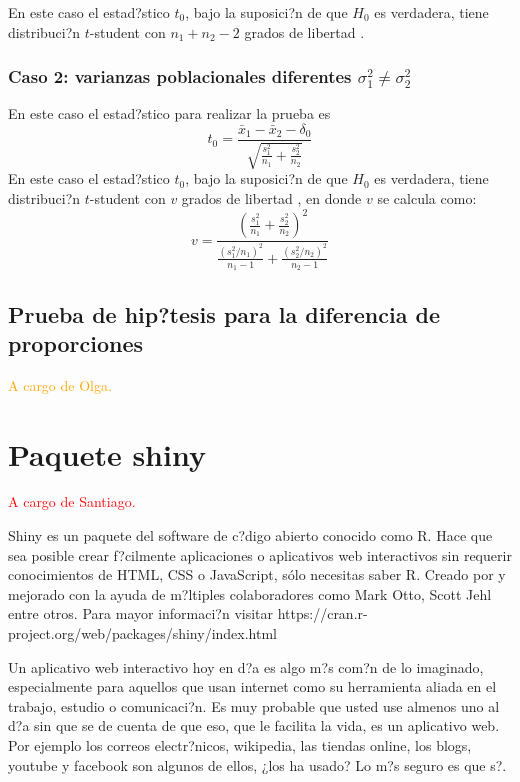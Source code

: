 \documentclass[]{comunicaciones}
\newcommand{\pkg}[1]{{\normalfont\fontseries{b}\selectfont #1}}
\begin{document}
En este caso el estad?stico $t_0$, bajo la suposici?n de que $H_0$ es verdadera, tiene distribuci?n $t$-student con $n_1+n_2-2$ grados de libertad \cite{Walpole12}.

\subsubsection{Caso 2: varianzas poblacionales diferentes $\sigma_1^2 \neq \sigma_2^2$}
En este caso el estad?stico para realizar la prueba es 
$$t_0=\frac{\bar{x}_1 - \bar{x}_2 - \delta_0}{\sqrt{\frac{s_1^2}{n_1} + \frac{s_2^2}{n_2}}}$$
En este caso el estad?stico $t_0$, bajo la suposici?n de que $H_0$ es verdadera, tiene distribuci?n $t$-student con $v$ grados de libertad \cite{Walpole12}, en donde $v$ se calcula como:
$$v=\frac{ \left( \frac{s_1^2}{n_1} + \frac{s_2^2}{n_2} \right)^2 }{ \frac{(s_1^2/n_1)^2}{n_1-1} + \frac{(s_2^2/n_2)^2}{n_2-1}}$$

\subsection{Prueba de hip?tesis para la diferencia de proporciones}
\textcolor{orange}{A cargo de Olga.}

\section{Paquete \pkg{shiny}}
\textcolor{red}{A cargo de Santiago.}

Shiny es un paquete del software de c?digo abierto conocido como R. Hace que sea posible crear f?cilmente aplicaciones o aplicativos web interactivos sin requerir conocimientos de HTML, CSS o JavaScript, sólo necesitas saber R. Creado por \cite{Winston17} y mejorado con la ayuda de m?ltiples colaboradores como Mark Otto, Scott Jehl entre otros. Para mayor informaci?n visitar https://cran.r-project.org/web/packages/shiny/index.html

Un aplicativo web interactivo hoy en d?a es algo m?s com?n de lo imaginado, especialmente para aquellos que usan internet como su herramienta aliada en el trabajo, estudio o comunicaci?n. Es muy probable que usted use almenos uno al d?a sin que se de cuenta de que eso, que le facilita la vida, es un aplicativo web. Por ejemplo los correos electr?nicos, wikipedia, las tiendas online, los blogs, youtube y facebook son algunos de ellos, ¿los ha usado? Lo m?s seguro es que s?.
\end{document}
